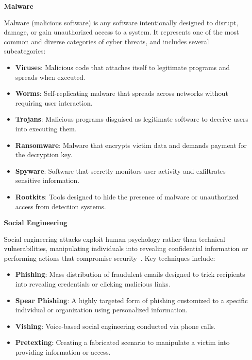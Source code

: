 \textbf{Malware}\par
Malware (malicious software) is any software intentionally designed to disrupt, damage, or gain unauthorized access to a system. It represents one of the most common and diverse categories of cyber threats, and includes several subcategories:
\begin{itemize}
    \item \textbf{Viruses}: Malicious code that attaches itself to legitimate programs and spreads when executed.
    \item \textbf{Worms}: Self-replicating malware that spreads across networks without requiring user interaction.
    \item \textbf{Trojans}: Malicious programs disguised as legitimate software to deceive users into executing them.
    \item \textbf{Ransomware}: Malware that encrypts victim data and demands payment for the decryption key.
    \item \textbf{Spyware}: Software that secretly monitors user activity and exfiltrates sensitive information.
    \item \textbf{Rootkits}: Tools designed to hide the presence of malware or unauthorized access from detection systems.
\end{itemize}

\textbf{Social Engineering}\par
Social engineering attacks exploit human psychology rather than technical vulnerabilities, manipulating individuals into revealing confidential information or performing actions that compromise security~\cite{sentinelone2024social,akram2025social}. Key techniques include:
\begin{itemize}
    \item \textbf{Phishing}: Mass distribution of fraudulent emails designed to trick recipients into revealing credentials or clicking malicious links.
    \item \textbf{Spear Phishing}: A highly targeted form of phishing customized  to a specific individual or organization using personalized information.
    \item \textbf{Vishing}: Voice-based social engineering conducted via phone calls.
    \item \textbf{Pretexting}: Creating a fabricated scenario to manipulate a victim into providing information or access.
\end{itemize}

